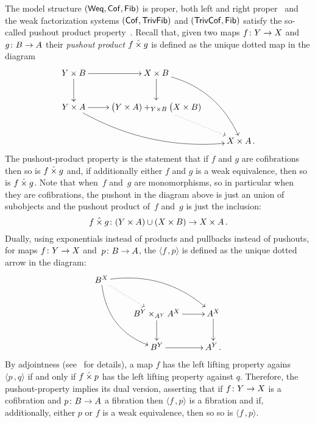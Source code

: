 \documentclass[reqno,10pt,a4paper,oneside,draft]{amsart}
\begin{document}
\medskip

The model structure $(\mathsf{Weq}, \mathsf{Cof}, \mathsf{Fib})$ is proper, \ie both left and right proper~\cite[Propositions 2.2.9 and 3.5.2]{henry2019qms}
and the weak factorization systems $(\mathsf{Cof}, \mathsf{TrivFib})$ and $(\mathsf{TrivCof}, \mathsf{Fib})$
satisfy the so-called pushout product property~\cite[Proposition 5.1.5 and Corollary 5.2.3]{henry2018wms}. Recall that, given two maps $f \colon Y \rightarrow X$ and $g \colon B \rightarrow A$ their \emph{pushout product} $f \mathbin{\hat{\times}} g$ is defined as the unique dotted map in the diagram
\[
\xymatrix{
Y \times B \ar[r] \ar[d] &  X \times B \ar[d] \ar@/^1.5pc/[ddr] \\
Y \times A \ar[r]  \ar@/_1.5pc/[drr] & \displaystyle \big( Y \times A ) +_{Y \times B} \big( X \times B ) \ar@{.>}[dr]  \\
 & & X \times A \, . }
 \]
The pushout-product property is  the statement that  if $f$ and $g$ are cofibrations then so is $f \mathbin{\hat{\times}} g$
and, if additionally either $f$ and $g$ is a weak equivalence, then so is $f \mathbin{\hat{\times}} g$.
Note that when~$f$ and~$g$ are monomorphisms, so in particular when they are cofibrations, the pushout in the diagram above is just an union of subobjects and the pushout product of~$f$ and~$g$ is just the inclusion:
\[  
f \mathbin{\hat{\times}} g \colon (Y \times A) \cup (X \times B) \rightarrow X \times A \, .
\]
Dually, using  exponentials instead of products and pullbacks instead of pushouts, for maps $f \colon Y \rightarrow X$ and~$p \colon B \rightarrow A$, the   $\langle f \, , p \rangle$ is defined as the unique dotted arrow in the diagram:
\[
\xymatrix{
 B^X \ar@{.>}[dr] \ar@/^1.5pc/[drr] \ar@/_1.5pc/[ddr] \\
& B^Y \times_{A^Y} A^X \ar[r] \ar[d] &  A^X \ar[d]  \\
& B^Y \ar[r] & A^Y  \, . \\
 }
 \]
By adjointness (see~\cite{joyal-tierney-segal} for details), a map $f$ has the left lifting property agains $\langle p \, , q \rangle $ if and only if $f \mathbin{\hat{\times}} p$ has the left lifting property against $q$.
Therefore, the pushout-property  implies its dual version, asserting that  if $f \colon Y \to X$ is a cofibration and $p \colon B \to A$ a fibration then $\langle f \, , p \rangle$ is a fibration and if, additionally,  either $p$ or $f$ is a weak equivalence, then so so is $\langle f \, , p \rangle$.

\medskip
\end{document}
